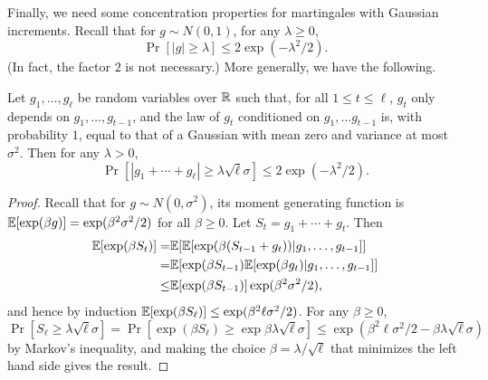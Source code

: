 Finally, we need some concentration properties for martingales with Gaussian increments.
Recall that for  $g \sim N(0,1)$, for any $\lambda \geq  0$, \[\Pr[ |g| \geq \lambda] \leq 2\exp(-\lambda^2/2).\]
(In fact, the factor $2$ is not necessary.) More generally, we have the following.
\begin{lemma}
\label{ch4:lm-martingale-bound}
Let $g_1,\ldots,g_\ell$ be random variables over $\mathbb{R}$ such that, for all $1 \leq t \leq \ell$,  $g_t$ only depends on $g_1,\ldots,g_{t-1}$, and the law of $g_t$ conditioned on $g_1, \ldots g_{t-1}$ is, with probability $1$, equal to that of a Gaussian with mean zero and variance at most $\sigma^2$.
  Then for any $\lambda > 0$, \[\Pr[|g_1 + \cdots + g_\ell| \geq  \lambda  \sqrt{\ell}\sigma] \leq  2\exp(-\lambda^2/2).\]
\end{lemma}
\begin{proof}
Recall that for $g \sim N(0,\sigma^2)$, its moment generating function is $\mathbb{E}[ \exp(\beta g)] = \exp(\beta^2\sigma^2/2)$ for all $\beta \geq 0$. 
Let $S_t =g_1 + \cdots + g_t$. Then
\begin{align*}
\mathbb{E}[\exp(\beta S_t)]   = & \mathbb{E}[ \mathbb{E}[ \exp(\beta (S_{t-1} + g_t)) | g_1,\ldots,g_{t-1}]] \\
=  & \mathbb{E}  [\exp(\beta S_{t-1}) \mathbb{E}[ \exp(\beta g_t) | g_1,\ldots,g_{t-1}]] \\ 
\leq &  \mathbb{E} [\exp(\beta S_{t-1})] \exp(\beta^2\sigma^2/2),
\end{align*}
and hence by induction $\mathbb{E}[\exp(\beta S_\ell)] \leq \exp(\beta^2 \ell\sigma^2/2)$.
For any $\beta\geq 0$,
 \[\Pr[S_\ell \geq \lambda \sqrt{\ell}\sigma] = \Pr[\exp(\beta S_\ell) \geq \exp{ \beta \lambda \sqrt{\ell}\sigma}] \leq  \exp(\beta^2 \ell\sigma^2/2 -\beta  \lambda \sqrt{\ell}\sigma)\] by Markov's inequality, and making the choice $\beta = \lambda /\sqrt{\ell}$ that minimizes the left hand side gives the result.
\end{proof}

